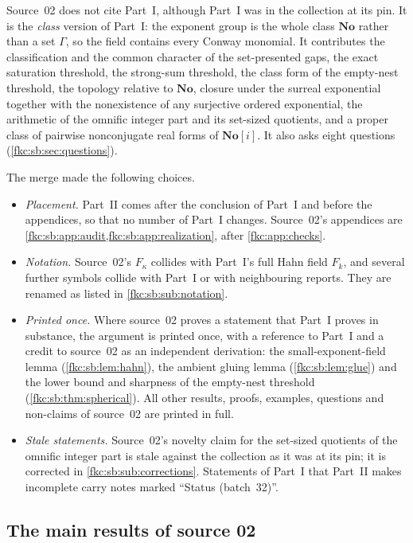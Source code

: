 \documentclass[11pt,letterpaper]{article}
\numberwithin{equation}{section}
\theoremstyle{definition}
\theoremstyle{remark}
\newcommand{\No}{\mathbf{No}}
\newcommand{\SC}{\mathbf{No}[i]}
\begin{document}
Source~02 does not cite Part~I, although Part~I was in the collection at its pin. It is the \emph{class} version of Part~I: the exponent group is the whole class $\No$ rather than a set $\Gamma$, so the field contains every Conway monomial. It contributes the classification and the common character of the set-presented gaps, the exact saturation threshold, the strong-sum threshold, the class form of the empty-nest threshold, the topology relative to $\No$, closure under the surreal exponential together with the nonexistence of any surjective ordered exponential, the arithmetic of the omnific integer part and its set-sized quotients, and a proper class of pairwise nonconjugate real forms of $\SC$. It also asks eight questions (\cref{fkc:sb:sec:questions}).

The merge made the following choices.
\begin{itemize}
\item \emph{Placement.} Part~II comes after the conclusion of Part~I and before the appendices, so that no number of Part~I changes. Source~02's appendices are \cref{fkc:sb:app:audit,fkc:sb:app:realization}, after \cref{fkc:app:checks}.
\item \emph{Notation.} Source~02's $F_\kappa$ collides with Part~I's full Hahn field $F_k$, and several further symbols collide with Part~I or with neighbouring reports. They are renamed as listed in \cref{fkc:sb:sub:notation}.
\item \emph{Printed once.} Where source~02 proves a statement that Part~I proves in substance, the argument is printed once, with a reference to Part~I and a credit to source~02 as an independent derivation: the small-exponent-field lemma (\cref{fkc:sb:lem:hahn}), the ambient gluing lemma (\cref{fkc:sb:lem:glue}) and the lower bound and sharpness of the empty-nest threshold (\cref{fkc:sb:thm:spherical}). All other results, proofs, examples, questions and non-claims of source~02 are printed in full.
\item \emph{Stale statements.} Source~02's novelty claim for the set-sized quotients of the omnific integer part is stale against the collection as it was at its pin; it is corrected in \cref{fkc:sb:sub:corrections}. Statements of Part~I that Part~II makes incomplete carry notes marked ``Status (batch~32)''.
\end{itemize}

\subsection{The main results of source 02}
\label{fkc:sb:sub:main}
\end{document}
